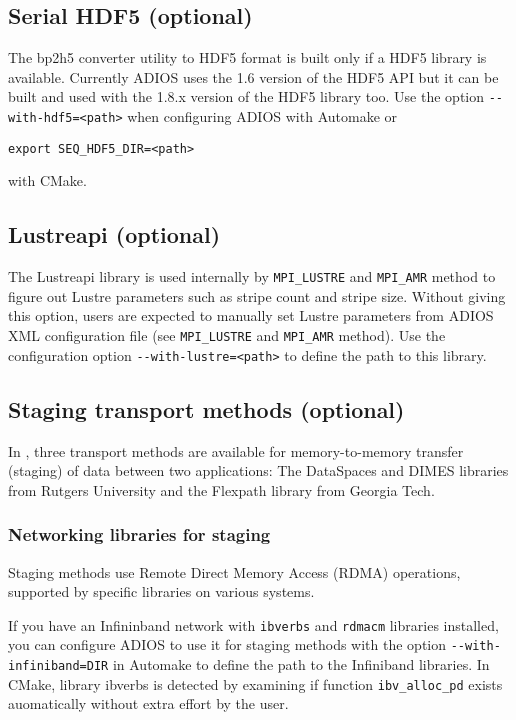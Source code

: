 \subsection{Serial HDF5 (optional)}

The bp2h5 converter utility to HDF5 format is built only if a HDF5 library is available. 
Currently ADIOS uses the 1.6 version of the HDF5 API but it can be built and used 
with the 1.8.x version of the HDF5 library too. Use the option \verb+--with-hdf5=<path>+ 
when configuring ADIOS with Automake or 
\begin{lstlisting}
export SEQ_HDF5_DIR=<path>
\end{lstlisting}
\noindent with CMake.

\subsection{Lustreapi (optional)}

The Lustreapi library is used internally by \verb+MPI_LUSTRE+ and \verb+MPI_AMR+ method to 
figure out Lustre parameters such as stripe count and stripe size.  Without giving 
this option, users are expected to manually set Lustre parameters from ADIOS XML 
configuration file (see \verb+MPI_LUSTRE+ and \verb+MPI_AMR+ method). 
Use the configuration option
\verb+--with-lustre=<path>+ to define the path to this library.

\subsection{Staging transport methods (optional)}

In \adiosversion, three transport methods
are available for memory-to-memory transfer (staging) of data between two 
applications: The DataSpaces and DIMES libraries from Rutgers University and
the Flexpath library from Georgia Tech.

\subsubsection{Networking libraries for staging}

Staging methods use Remote Direct Memory Access (RDMA) operations, supported by specific libraries 
on various systems. 

\vspace*{6pt}
If you have an Infininband network with \verb+ibverbs+ and \verb+rdmacm+ libraries installed, you can configure ADIOS to use it for staging methods with the option
\verb+--with-infiniband=DIR+  in Automake to define the path to the Infiniband libraries. In CMake, library ibverbs is detected by examining if function \verb+ibv_alloc_pd+ exists auomatically without extra effort by the user.

